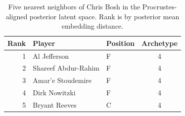 \begin{table}[htbp]
  \centering\small
  \begin{tabular}{rllc}
    \toprule
    Rank & Player & Position & Archetype \\
    \midrule
    1 & Al Jefferson & F & 4 \\
    2 & Shareef Abdur-Rahim & F & 4 \\
    3 & Amar'e Stoudemire & F & 4 \\
    4 & Dirk Nowitzki & F & 4 \\
    5 & Bryant Reeves & C & 4 \\
    \bottomrule
  \end{tabular}
  \caption{Five nearest neighbors of Chris Bosh in the Procrustes-aligned posterior latent space. Rank is by posterior mean embedding distance.}
  \label{tab:Chris_Bosh_neighbors}
\end{table}

